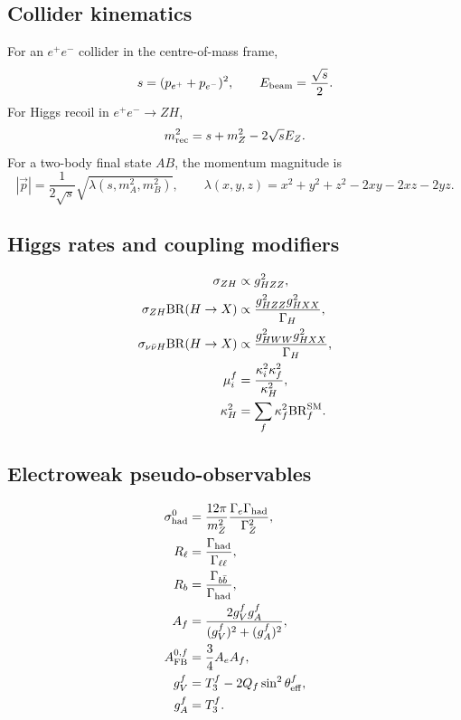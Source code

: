 \documentclass[11pt,a4paper]{article}
\newcommand{\BR}{\mathrm{BR}}
\numberwithin{equation}{section}
\begin{document}
\subsection{Collider kinematics}
For an \(e^+e^-\) collider in the centre-of-mass frame,
\begin{equation}
  s=(p_{e^+}+p_{e^-})^2,
  \qquad
  E_{\rm beam}=\frac{\sqrt{s}}{2} .
\end{equation}
For Higgs recoil in \(e^+e^-\to ZH\),
\begin{equation}
  m_{\rm rec}^2=s+m_Z^2-2\sqrt{s}E_Z .
\end{equation}
For a two-body final state \(AB\), the momentum magnitude is
\begin{equation}
  |\vec p|=\frac{1}{2\sqrt{s}}\sqrt{\lambda(s,m_A^2,m_B^2)},
  \qquad
  \lambda(x,y,z)=x^2+y^2+z^2-2xy-2xz-2yz .
\end{equation}

\subsection{Higgs rates and coupling modifiers}
\begin{align}
  \sigma_{ZH} &\propto g_{HZZ}^2,\\
  \sigma_{ZH}\BR(H\to X)&\propto\frac{g_{HZZ}^2g_{HXX}^2}{\Gamma_H},\\
  \sigma_{\nu\bar\nu H}\BR(H\to X)&\propto\frac{g_{HWW}^2g_{HXX}^2}{\Gamma_H},\\
  \mu_i^f&=\frac{\kappa_i^2\kappa_f^2}{\kappa_H^2},\\
  \kappa_H^2&=\sum_f\kappa_f^2\BR_f^{\rm SM}.
\end{align}

\subsection{Electroweak pseudo-observables}
\begin{align}
  \sigma^0_{\rm had}&=\frac{12\pi}{m_Z^2}\frac{\Gamma_e\Gamma_{\rm had}}{\Gamma_Z^2},\\
  R_\ell&=\frac{\Gamma_{\rm had}}{\Gamma_{\ell\ell}},\\
  R_b&=\frac{\Gamma_{b\bar b}}{\Gamma_{\rm had}},\\
  A_f&=\frac{2g_V^fg_A^f}{(g_V^f)^2+(g_A^f)^2},\\
  A_{\rm FB}^{0,f}&=\frac34 A_eA_f,\\
  g_V^f&=T_3^f-2Q_f\sin^2\theta_{\rm eff}^f,\\
  g_A^f&=T_3^f.
\end{align}
\end{document}
